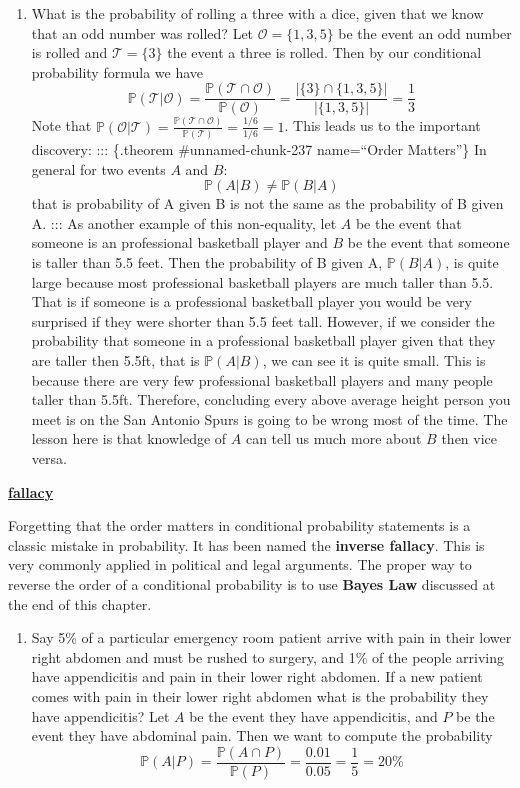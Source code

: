 \documentclass[
]{book}
\providecommand{\tightlist}{%
  \setlength{\itemsep}{0pt}\setlength{\parskip}{0pt}}
\newcommand{\prob}[1]{{\mathbb{P}(#1)}}
\newcommand{\condprob}[2]{{\prob{#1|#2}=\frac{\prob{#1 \cap #2}}{\prob{#2}}}}
\newenvironment{rmdblock}[1]
  {\begin{shaded*}
  \centerline{\underline{\textbf{#1}}}

  }
  {
  \end{shaded*}
  }
\newenvironment{fallacy}
  {\begin{rmdblock}{fallacy}}
  {\end{rmdblock}}
\theoremstyle{definition}
\theoremstyle{definition}
\theoremstyle{definition}
\theoremstyle{definition}
\theoremstyle{remark}
\begin{document}
\begin{enumerate}
\def\labelenumi{\arabic{enumi}.}
\tightlist
\item
  What is the probability of rolling a three with a dice, given that we know that an odd number was rolled?
  Let \(\mathcal{O}=\{1,3,5\}\) be the event an odd number is rolled and \(\mathcal{T}=\{3\}\) the event a three is rolled. Then by our conditional probability formula we have
  \[
  \prob{\mathcal{T}|\mathcal{O}}=\frac{\prob{\mathcal{T} \cap \mathcal{O}}}{\prob{\mathcal{O}}}=\frac{|\{3\} \cap \{1,3,5\} |}{| \{1,3,5\}|}=\frac{1}{3}
  \]
  Note that \(\prob{\mathcal{O}|\mathcal{T}}=\frac{\prob{\mathcal{T} \cap \mathcal{O}}}{\prob{\mathcal{T}}}=\frac{1/6}{1/6}=1\). This leads us to the important discovery:
  ::: \{.theorem \#unnamed-chunk-237 name=``Order Matters''\}
  In general for two events \(A\) and \(B\): \[\prob{A|B}\neq\prob{B|A}\] that is probability of A given B is not the same as the probability of B given A.
  :::
  As another example of this non-equality, let \(A\) be the event that someone is an professional basketball player and \(B\) be the event that someone is taller than 5.5 feet. Then the probability of B given A, \(\prob{B|A}\), is quite large because most professional basketball players are much taller than 5.5. That is if someone is a professional basketball player you would be very surprised if they were shorter than 5.5 feet tall. However, if we consider the probability that someone in a professional basketball player given that they are taller then 5.5ft, that is \(\prob{A|B}\), we can see it is quite small. This is because there are very few professional basketball players and many people taller than 5.5ft. Therefore, concluding every above average height person you meet is on the San Antonio Spurs is going to be wrong most of the time. The lesson here is that knowledge of \(A\) can tell us much more about \(B\) then vice versa.
\end{enumerate}

\begin{fallacy}
Forgetting that the order matters in conditional probability statements is a classic mistake in probability. It has been named the \textbf{inverse fallacy}. This is very commonly applied in political and legal arguments. The proper way to reverse the order of a conditional probability is to use \textbf{Bayes Law} discussed at the end of this chapter.\\
\end{fallacy}

\begin{enumerate}
\def\labelenumi{\arabic{enumi}.}
\setcounter{enumi}{1}
\tightlist
\item
  Say 5\% of a particular emergency room patient arrive with pain in their lower right abdomen and must be rushed to surgery, and 1\% of the people arriving have appendicitis and pain in their lower right abdomen. If a new patient comes with pain in their lower right abdomen what is the probability they have appendicitis?
  Let \(A\) be the event they have appendicitis, and \(P\) be the event they have abdominal pain. Then we want to compute the probability \[\condprob{A}{P}=\frac{0.01}{0.05}=\frac{1}{5}=20\%\]
\end{enumerate}
\end{document}
